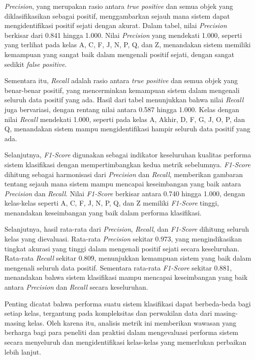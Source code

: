 \textit{Precision}, yang merupakan rasio antara \textit{true positive} dan semua objek yang diklasifikasikan sebagai positif, menggambarkan sejauh mana sistem dapat mengidentifikasi positif sejati dengan akurat. Dalam tabel, nilai \textit{Precision} berkisar dari 0.841 hingga 1.000. Nilai \textit{Precision} yang mendekati 1.000, seperti yang terlihat pada kelas A, C, F, J, N, P, Q, dan Z, menandakan sistem memiliki kemampuan yang sangat baik dalam mengenali positif sejati, dengan sangat sedikit \textit{false positive}.

Sementara itu, \textit{Recall} adalah rasio antara \textit{true positive} dan semua objek yang benar-benar positif, yang mencerminkan kemampuan sistem dalam mengenali seluruh data positif yang ada. Hasil dari tabel menunjukkan bahwa nilai \textit{Recall} juga bervariasi, dengan rentang nilai antara 0.587 hingga 1.000. Kelas dengan nilai \textit{Recall} mendekati 1.000, seperti pada kelas A, Akhir, D, F, G, J, O, P, dan Q, menandakan sistem mampu mengidentifikasi hampir seluruh data positif yang ada.

Selanjutnya, \textit{F1-Score} digunakan sebagai indikator keseluruhan kualitas performa sistem klasifikasi dengan mempertimbangkan kedua metrik sebelumnya. \textit{F1-Score} dihitung sebagai harmonisasi dari \textit{Precision} dan \textit{Recall}, memberikan gambaran tentang sejauh mana sistem mampu mencapai keseimbangan yang baik antara \textit{Precision} dan \textit{Recall}. Nilai \textit{F1-Score} berkisar antara 0.740 hingga 1.000, dengan kelas-kelas seperti A, C, F, J, N, P, Q, dan Z memiliki \textit{F1-Score} tinggi, menandakan keseimbangan yang baik dalam performa klasifikasi.

Selanjutnya, hasil rata-rata dari \textit{Precision}, \textit{Recall}, dan \textit{F1-Score} dihitung seluruh kelas yang dievaluasi. Rata-rata \textit{Precision} sekitar 0.973, yang mengindikasikan tingkat akurasi yang tinggi dalam mengenali positif sejati secara keseluruhan. Rata-rata \textit{Recall} sekitar 0.809, menunjukkan kemampuan sistem yang baik dalam mengenali seluruh data positif. Sementara rata-rata \textit{F1-Score} sekitar 0.881, menandakan bahwa sistem klasifikasi mampu mencapai keseimbangan yang baik antara \textit{Precision} dan \textit{Recall} secara keseluruhan.

Penting dicatat bahwa performa suatu sistem klasifikasi dapat berbeda-beda bagi setiap kelas, tergantung pada kompleksitas dan perwakilan data dari masing-masing kelas. Oleh karena itu, analisis metrik ini memberikan wawasan yang berharga bagi para peneliti dan praktisi dalam mengevaluasi performa sistem secara menyeluruh dan mengidentifikasi kelas-kelas yang memerlukan perbaikan lebih lanjut.

